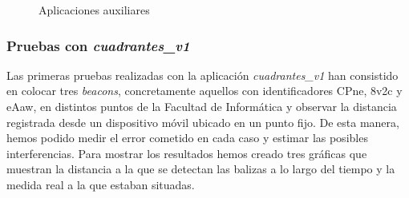\begin{figure}
	\centering
	\caption{Aplicaciones auxiliares}
	\label{f:apps}
\end{figure}

\subsubsection{Pruebas con \textit{cuadrantes\_v1}}

Las primeras pruebas realizadas con la aplicación \textit{cuadrantes\_v1} han consistido en colocar tres \textit{beacons}, concretamente aquellos con identificadores CPne, 8v2c y eAaw, en distintos puntos de la Facultad de Informática y observar la distancia registrada desde un dispositivo móvil ubicado en un punto fijo. De esta manera, hemos podido medir el error cometido en cada caso y estimar las posibles interferencias. Para mostrar los resultados hemos creado tres gráficas que muestran la distancia a la que se detectan las balizas a lo largo del tiempo y la medida real a la que estaban situadas. 

